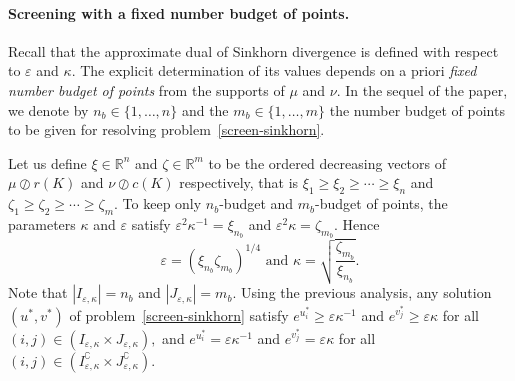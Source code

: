 \documentclass{article}
\newcommand{\R}{{\mathbb{R}}}
\begin{document}
\paragraph{Screening with a fixed number budget of points.}

Recall that the approximate dual of Sinkhorn divergence is defined with respect to $\varepsilon$ and $\kappa$. 
The explicit determination of its values depends on a priori \emph{fixed number budget of points} from the supports of $\mu$ and $\nu$. %
In the sequel of the paper, we denote by $n_b \in\{1, \ldots, n\}$ and the $m_b\in\{1, \ldots, m\}$ the number budget of points to be given for resolving problem~\eqref{screen-sinkhorn}. 

Let us define $\xi \in \R^n$ and $\zeta \in \R^m$ to be the ordered decreasing vectors of $\mu \oslash r(K)$ and $\nu \oslash c(K)$ respectively, that is $\xi_1 \geq \xi_2 \geq \cdots \geq \xi_n$ and $\zeta_1 \geq \zeta_2 \geq \cdots \geq \zeta_m$.
To keep only $n_b$-budget and $m_b$-budget of points, the parameters $\kappa$ and $\varepsilon$ satisfy ${\varepsilon^2}\kappa^{-1} = \xi_{n_b}$ and $\varepsilon^2\kappa = \zeta_{m_b}$. Hence 
\begin{equation}
\label{epsilon_kappa}
 \varepsilon = (\xi_{n_b}\zeta_{m_b})^{1/4} \text{ and } \kappa = \sqrt{\frac{\zeta_{m_b}}{\xi_{n_b}}}.
\end{equation}
Note that $|I_{\varepsilon, \kappa}| = n_b$ and $|J_{\varepsilon, \kappa}| = m_b$. 
Using the previous analysis, any solution $(u^*, v^*)$ of problem~\eqref{screen-sinkhorn} satisfy $e^{u^*_i} \geq \varepsilon\kappa^{-1}$ and $e^{v^*_j} \geq \varepsilon\kappa$ for all $(i,j) \in (I_{\varepsilon,\kappa}\times J_{\varepsilon,\kappa}),$ and $e^{u^*_i} = \varepsilon\kappa^{-1}$ and $e^{v^*_j} = \varepsilon\kappa$ for all $(i,j) \in (I^\complement_{\varepsilon,\kappa}\times J^\complement_{\varepsilon,\kappa})$.
\end{document}
